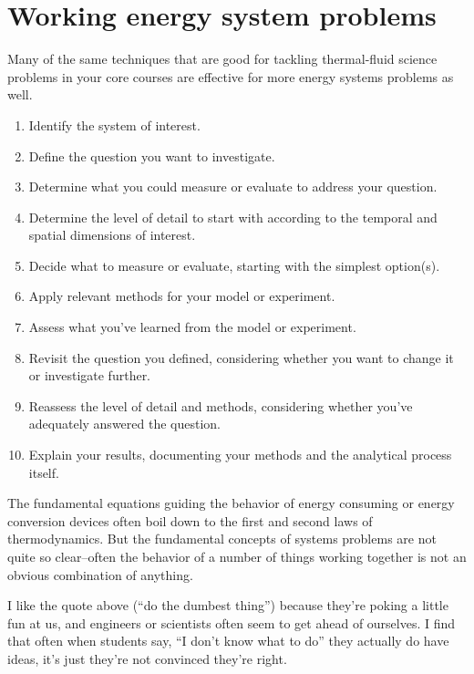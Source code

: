 \documentclass[10pt]{article}
\begin{document}
\section{Working energy system problems}

Many of the same techniques that are good for tackling thermal-fluid science problems in your core courses are effective for more energy systems problems as well.

{\selectfont
\begin{enumerate}
    \setlength{\itemsep}{0pt}
    \setlength{\parskip}{0pt}
    \item Identify the system of interest.
    \item Define the question you want to investigate.
    \item Determine what you could measure or evaluate to address your question.
    \item Determine the level of detail to start with according to the temporal and spatial dimensions of interest.
    \item Decide what to measure or evaluate, starting with the simplest option(s).
    \item Apply relevant methods for your model or experiment.
    \item Assess what you've learned from the model or experiment.
    \item Revisit the question you defined, considering whether you want to change it or investigate further.
    \item Reassess the level of detail and methods, considering whether you've adequately answered the question.
    \item Explain your results, documenting your methods and the analytical process itself.
\end{enumerate}
}

The fundamental equations guiding the behavior of energy consuming or energy conversion devices often boil down to the first and second laws of thermodynamics. But the fundamental concepts of systems problems are not quite so clear--often the behavior of a number of things working together is not an obvious combination of anything.

I like the quote above (``do the dumbest thing'') because they're poking a little fun at us, and engineers or scientists often seem to get ahead of ourselves. I find that often when students say, ``I don't know what to do'' they actually do have ideas, it's just they're not convinced they're right.
\end{document}
